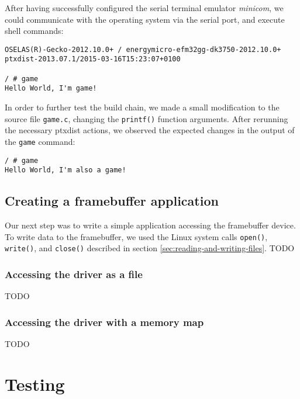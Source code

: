 After having successfully configured the serial terminal emulator \emph{minicom}, we could communicate with the operating system via the serial port, and execute shell commands:
\lstset{style=lststyle-terminal}
\begin{lstlisting}
OSELAS(R)-Gecko-2012.10.0+ / energymicro-efm32gg-dk3750-2012.10.0+
ptxdist-2013.07.1/2015-03-16T15:23:07+0100

/ # game
Hello World, I'm game!
\end{lstlisting}

In order to further test the build chain, we made a small modification to the source file \texttt{game.c}, changing the \texttt{printf()} function arguments. After rerunning the necessary ptxdist actions, we observed the expected changes in the output of the \texttt{game} command:
\lstset{style=lststyle-terminal}
\begin{lstlisting}
/ # game
Hello World, I'm also a game!
\end{lstlisting}

\subsection{Creating a framebuffer application}
Our next step was to write a simple application accessing the framebuffer device. To write data to the framebuffer, we used the Linux system calls \texttt{open()}, \texttt{write()}, and \texttt{close()} described in section \ref{sec:reading-and-writing-files}.
TODO %

\subsubsection{Accessing the driver as a file}
TODO %

\subsubsection{Accessing the driver with a memory map}
TODO %



\section{Testing}
